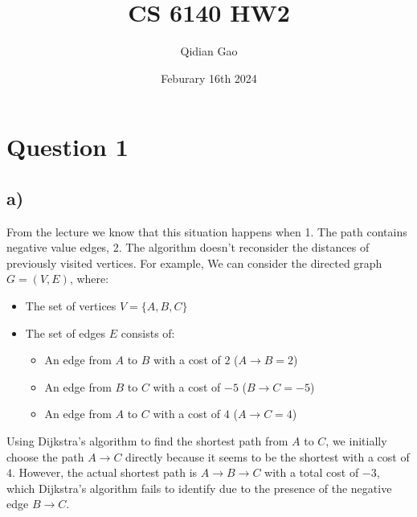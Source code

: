 \documentclass{article}
\title{CS 6140 HW2}
\author{Qidian Gao}
\date{Feburary 16th 2024}
\begin{document}
\maketitle

\section{Question 1}
\subsection{a)}
From the lecture we know that this situation happens when 1. The path contains negative value edges, 2. The algorithm doesn't reconsider the distances of previously visited vertices. For example, We can consider the directed graph \(G=(V, E)\), where:
\begin{itemize}
    \item The set of vertices \(V = \{A, B, C\}\)
    \item The set of edges \(E\) consists of:
    \begin{itemize}
        \item An edge from \(A\) to \(B\) with a cost of \(2\) (\(A \rightarrow B = 2\))
        \item An edge from \(B\) to \(C\) with a cost of \(-5\) (\(B \rightarrow C = -5\))
        \item An edge from \(A\) to \(C\) with a cost of \(4\) (\(A \rightarrow C = 4\))
    \end{itemize}
\end{itemize}

Using Dijkstra's algorithm to find the shortest path from \(A\) to \(C\), we initially choose the path \(A \rightarrow C\) directly because it seems to be the shortest with a cost of \(4\). However, the actual shortest path is \(A \rightarrow B \rightarrow C\) with a total cost of \(-3\), which Dijkstra's algorithm fails to identify due to the presence of the negative edge \(B \rightarrow C\).
\begin{center}
    
\end{center}
\end{document}
